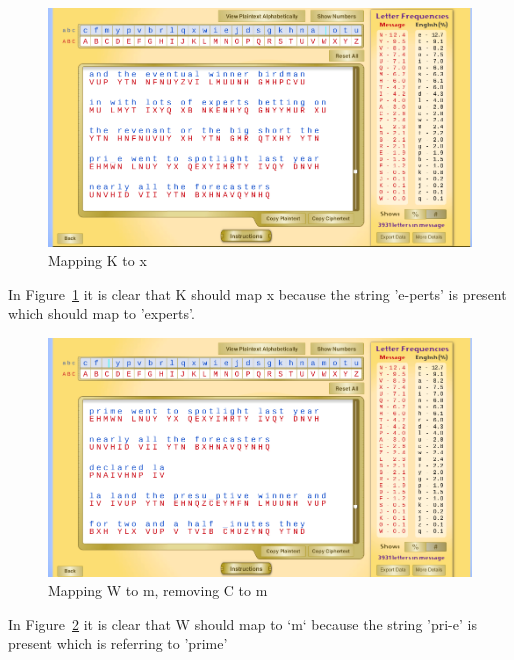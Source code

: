 \documentclass[12pt]{article}
\begin{document}
\begin{figure}[H]
    \begin{center}
        \includegraphics[scale=0.48]{c18.png}
    \end{center}{}
    \caption{Mapping K to x}
    \label{fig:c18}
\end{figure}

In Figure~\ref{fig:c18} it is clear that K should map x because the string 'e-perts' is present which should map to
'experts'.

\begin{figure}[H]
    \begin{center}
        \includegraphics[scale=0.48]{c19.png}
    \end{center}{}
    \caption{Mapping W to m, removing C to m}
    \label{fig:c19}
\end{figure}

In Figure~\ref{fig:c19} it is clear that W should map to `m` because the string 'pri-e' is present which is referring to
'prime'
\end{document}
